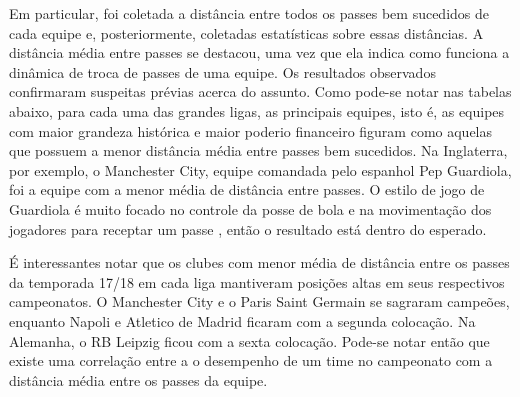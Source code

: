 \documentclass{article}
\begin{document}
Em particular, foi coletada a distância entre todos os passes bem sucedidos de
cada equipe e, posteriormente, coletadas estatísticas sobre essas distâncias. A
distância média
entre passes se destacou, uma vez que ela indica como funciona a dinâmica de
troca de passes de uma equipe. Os resultados observados confirmaram suspeitas
prévias acerca do assunto.
Como pode-se notar nas tabelas abaixo, para cada uma das grandes ligas, as
principais equipes, isto é, as equipes com maior grandeza histórica e maior
poderio financeiro figuram como aquelas
que possuem a menor distância média entre passes bem sucedidos. Na Inglaterra,
por exemplo, o Manchester City, equipe comandada pelo espanhol Pep Guardiola,
foi a equipe com a menor média
de distância entre passes. O estilo de jogo de Guardiola é muito focado no
controle da posse de bola e na movimentação dos jogadores para receptar um
passe \cite{terzis2023pep}, então o resultado está dentro do
esperado.

É interessantes notar que os clubes com menor média de distância entre os
passes da temporada 17/18 em cada liga mantiveram posições altas em seus
respectivos campeonatos. O Manchester City e o Paris Saint Germain se sagraram
campeões, enquanto Napoli e Atletico de Madrid ficaram com a segunda colocação.
Na Alemanha, o RB Leipzig ficou com a sexta colocação. Pode-se notar então que
existe uma correlação entre a o desempenho de um time no campeonato com a
distância média entre os passes da equipe.
\end{document}
